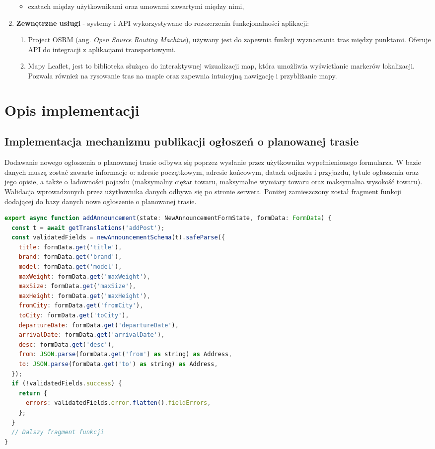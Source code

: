 \begin{enumerate}
\begin{itemize}
        \item czatach między użytkownikami oraz umowami zawartymi między nimi,
    \end{itemize}
    \item \textbf{Zewnętrzne usługi} - systemy i API wykorzystywane do rozszerzenia funkcjonalności aplikacji:
    \begin{enumerate}
        \item Project OSRM (ang. \emph{Open Source Routing Machine}), używany jest do zapewnia funkcji wyznaczania tras między punktami. Oferuje API do integracji z aplikacjami transportowymi.
        \item Mapy Leaflet, jest to biblioteka służąca do interaktywnej wizualizacji map, która umożliwia wyświetlanie markerów lokalizacji. Pozwala również na rysowanie tras na mapie oraz zapewnia intuicyjną nawigację i przybliżanie mapy.
    \end{enumerate}
\end{enumerate}

\section{Opis implementacji}
\subsection{Implementacja mechanizmu publikacji ogłoszeń o planowanej trasie}
\label{addAnnouncement}
Dodawanie nowego ogłoszenia o planowanej trasie odbywa się poprzez wysłanie przez użytkownika wypełnienionego formularza. W bazie danych muszą zostać zawarte informacje o: adresie początkowym, adresie końcowym, datach odjazdu i przyjazdu, tytule ogłoszenia oraz jego opisie, a także o ładowności pojazdu (maksymalny ciężar towaru, maksymalne wymiary towaru oraz maksymalna wysokość towaru). Walidacja wprowadzonych przez użytkownika danych odbywa się po stronie serwera. Poniżej zamieszczony został fragment funkcji dodającej do bazy danych nowe ogłoszenie o planowanej trasie.

{\belowcaptionskip=-9pt
\begin{lstlisting}[language=JavaScript,caption=Wstępna walidacja danych przed dodaniem ogłoszenia do bazy danych, label=lst:addAnnouncement]
export async function addAnnouncement(state: NewAnnouncementFormState, formData: FormData) {
  const t = await getTranslations('addPost');
  const validatedFields = newAnnouncementSchema(t).safeParse({
    title: formData.get('title'),
    brand: formData.get('brand'),
    model: formData.get('model'),
    maxWeight: formData.get('maxWeight'),
    maxSize: formData.get('maxSize'),
    maxHeight: formData.get('maxHeight'),
    fromCity: formData.get('fromCity'),
    toCity: formData.get('toCity'),
    departureDate: formData.get('departureDate'),
    arrivalDate: formData.get('arrivalDate'),
    desc: formData.get('desc'),
    from: JSON.parse(formData.get('from') as string) as Address,
    to: JSON.parse(formData.get('to') as string) as Address,
  });
  if (!validatedFields.success) {
    return {
      errors: validatedFields.error.flatten().fieldErrors,
    };
  }
  // Dalszy fragment funkcji
}
\end{lstlisting}
}

